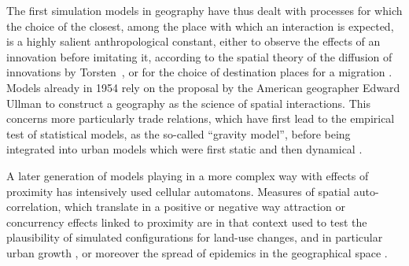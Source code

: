 \documentclass[10pt]{article}
\begin{document}
The first simulation models in geography have thus dealt with processes for which the choice of the closest, among the place with which an interaction is expected, is a highly salient anthropological constant, either to observe the effects of an innovation before imitating it, according to the spatial theory of the diffusion of innovations by Torsten~\cite{}, or for the choice of destination places for a migration \citep{}. Models already in 1954 rely on the proposal by the American geographer Edward Ullman to construct a geography as the science of spatial interactions. This concerns more particularly trade relations, which have first lead to the empirical test of statistical models, as the so-called ``gravity model'', before being integrated into urban models which were first static \citep{} and then dynamical \citep{}.


A later generation of models playing in a more complex way with effects of proximity has intensively used cellular automatons. Measures of spatial auto-correlation, which translate in a positive or negative way attraction or concurrency effects linked to proximity are in that context used to test the plausibility of simulated configurations for land-use changes, and in particular urban growth \citep{}, or moreover the spread of epidemics in the geographical space \citep{}.
\end{document}
